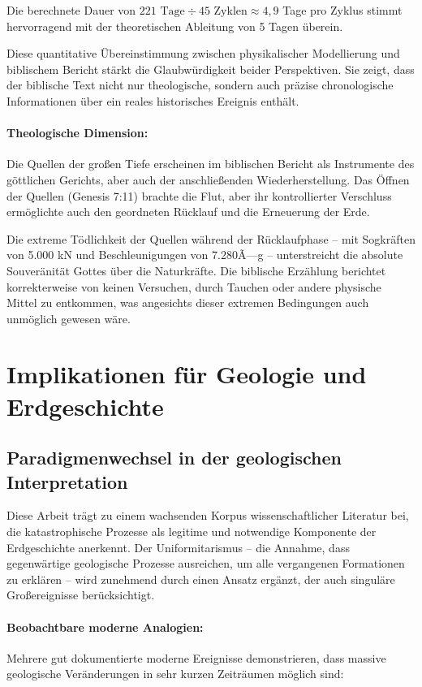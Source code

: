 ﻿\documentclass[12pt,a4paper]{report}
\begin{document}
Die berechnete Dauer von $221 \text{ Tage} \div 45 \text{ Zyklen} \approx 4{,}9$ Tage pro Zyklus stimmt hervorragend mit der theoretischen Ableitung von 5 Tagen überein.

Diese quantitative Übereinstimmung zwischen physikalischer Modellierung und biblischem Bericht stärkt die Glaubwürdigkeit beider Perspektiven. Sie zeigt, dass der biblische Text nicht nur theologische, sondern auch präzise chronologische Informationen über ein reales historisches Ereignis enthält.

\paragraph{Theologische Dimension:}
Die Quellen der großen Tiefe erscheinen im biblischen Bericht als Instrumente des göttlichen Gerichts, aber auch der anschließenden Wiederherstellung. Das Öffnen der Quellen (Genesis 7:11) brachte die Flut, aber ihr kontrollierter Verschluss ermöglichte auch den geordneten Rücklauf und die Erneuerung der Erde.

Die extreme Tödlichkeit der Quellen während der Rücklaufphase -- mit Sogkräften von 5.000 kN und Beschleunigungen von 7.280Ã—g -- unterstreicht die absolute Souveränität Gottes über die Naturkräfte. Die biblische Erzählung berichtet korrekterweise von keinen Versuchen, durch Tauchen oder andere physische Mittel zu entkommen, was angesichts dieser extremen Bedingungen auch unmöglich gewesen wäre.

\section{Implikationen für Geologie und Erdgeschichte}

\subsection{Paradigmenwechsel in der geologischen Interpretation}

Diese Arbeit trägt zu einem wachsenden Korpus wissenschaftlicher Literatur bei, die katastrophische Prozesse als legitime und notwendige Komponente der Erdgeschichte anerkennt. Der Uniformitarismus -- die Annahme, dass gegenwärtige geologische Prozesse ausreichen, um alle vergangenen Formationen zu erklären -- wird zunehmend durch einen Ansatz ergänzt, der auch singuläre Großereignisse berücksichtigt.

\paragraph{Beobachtbare moderne Analogien:}
Mehrere gut dokumentierte moderne Ereignisse demonstrieren, dass massive geologische Veränderungen in sehr kurzen Zeiträumen möglich sind:
\end{document}
